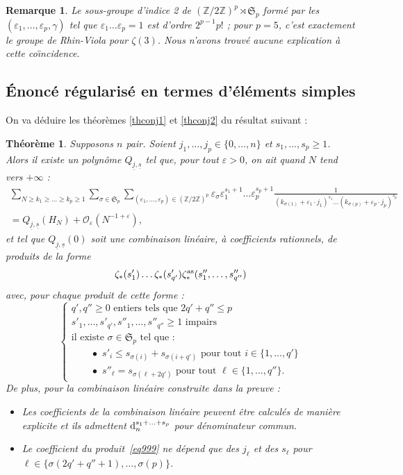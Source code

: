 \documentclass[12pt,francais, reqno]{smfart}
\numberwithin{equation}{section}
\newcommand{\dd}{\textup{d}}
\def\dd{\textup{d}}
\newcommand{\Z}{\mathbb Z}
\newcommand{\gdo}{\mathcal{O}}
\newcommand{\spp}{{\mathfrak S}_p}
\newcommand{\zdzp}{(\Z / 2 \Z)^p}
\newcommand{\psd}{\rtimes}
\newcommand{\qjs}{Q_{\underline j, \underline s}}
\newcommand{\eps}{\varepsilon}
\newcommand{\zeron}{\{0,\ldots, n\}}
\newcommand{\unqpr}{\{1,\ldots, q'\}}
\newcommand{\unqsec}{\{1,\ldots, q''\}}
\newcommand{\zetaetoile}{\zeta _*}
\newcommand{\zetaetoileantisym}{\zeta _* ^{{\rm as}}}
\newtheorem{Th}{Th\'eor\`eme}
\newtheorem{remark}{Remarque}[subsection]
\begin{document}
\begin{remark} Le sous-groupe d'indice 2 de $\zdzp \psd \spp$ form\'e par les $(\eps_1,\ldots, \eps_p, 
\gamma)$ tel que $\eps_1 \ldots \eps_p = 1$ est d'ordre $2^{p-1} p!$ ; pour $p=5$, c'est exactement le 
groupe de Rhin-Viola \cite{RV3} pour $\zeta(3)$.  
Nous n'avons trouv\'e aucune explication \`a cette co\"{\i}ncidence.
\end{remark}

\subsection{\'Enonc\'e r\'egularis\'e en termes d'\'el\'ements simples}  \label{subsec42}

On va d\'eduire les th\'eor\`emes \ref{thconj1} et  \ref{thconj2} du r\'esultat suivant : 

\begin{Th} \label{thconj3}
Supposons $n$ pair. 
 Soient $j_1, \ldots, j_p \in \zeron$ et $s_1,\ldots,s_p  \geq 1$. Alors il existe un polyn\^ome $\qjs$ 
tel que,   pour tout $\eps > 0$, on ait quand $N$ tend vers $+\infty$ : 
\begin{multline} 
\sum_{N \geq k_1 \geq \ldots \geq k_p \geq 1} 
 \sum_{\sigma \in \spp}
 \sum_{(\eps_1,\ldots,\eps_p)\in \zdzp} 
\eps_\sigma  \eps_1^{s_1+1} \ldots \eps_p ^{s_p+1} 
\frac{1}{(k_{\sigma(1)} + \eps_1 \cdot j_1)^{s_1} \ldots (k_{\sigma(p)} + \eps_p \cdot j_p)^{s_p}} 
\\
= \qjs (H_N) + \gdo_\eps (N^{-1+\eps}), 
\label{eq4} 
\end{multline}
et tel que $\qjs(0)$ soit  une combinaison lin\'eaire, \`a coefficients rationnels, 
de produits de la forme
\begin{equation} \label{eq999}
\zetaetoile(s'_1) \ldots  \zetaetoile(s'_{q'}) \zetaetoileantisym (s''_{1}, \ldots, s''_{q''})
\end{equation}
avec, pour chaque produit de cette forme :  
$$
\left\{
\begin{array}{l}
q' ,q'' \geq 0   \mbox{ entiers tels que } 2q'+q'' \leq p \\
s'_1, \ldots, s'_{q'}, s''_{1}, \ldots, s''_{q''} \geq 1 \mbox{  impairs } \\
\mbox{il existe } \sigma \in \spp \mbox{ tel que : }\\
\quad \quad \bullet \, \, s'_i \leq s_{\sigma(i)} + s_{\sigma(i+q')} \mbox{ pour tout } i \in \unqpr \\
\quad \quad \bullet \, \, s''_\ell  = s_{\sigma(\ell+2q')} \mbox{ pour tout } \ell \in \unqsec.
\end{array}
\right.
$$
De plus, pour la combinaison lin\'eaire  construite dans la preuve   : 
\begin{itemize}
\item Les coefficients de la combinaison lin\'eaire peuvent \^etre calcul\'es de mani\`ere explicite 
et ils admettent $\dd_n ^{s_1 + \ldots + s_p}$ pour d\'enominateur commun.
\item Le coefficient du produit~\eqref{eq999} ne d\'epend que des $j_{\ell}$ et des $s_\ell$ 
pour $\ell \in \{ \sigma(2q' + q'' + 1), \ldots, \sigma(p)\}$.
\end{itemize}
\end{Th}
\end{document}
